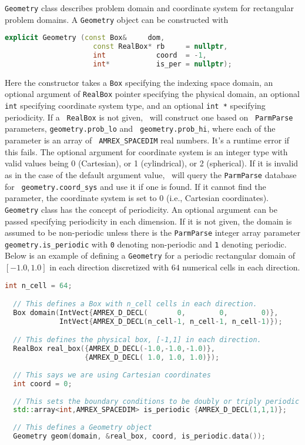 {\tt Geometry} class describes problem domain and coordinate system
for rectangular problem domains.  A {\tt Geometry} object can be
constructed with
\begin{lstlisting}[language=cpp]
  explicit Geometry (const Box&     dom,
                     const RealBox* rb     = nullptr,
                     int            coord  = -1,
                     int*           is_per = nullptr);
\end{lstlisting}
Here the constructor takes a {\tt Box} specifying the indexing space
domain, an optional argument of {\tt RealBox} pointer specifying the
physical domain, an optional {\tt int} specifying coordinate system
type, and an optional {\tt int *} specifying periodicity.  If a {\tt
  RealBox} is not given, \amrex\ will construct one based on {\tt
  ParmParse} parameters, {\tt geometry.prob\_lo} and {\tt
  geometry.prob\_hi}, where each of the parameter is an array of {\tt
  AMREX\_SPACEDIM} real numbers.  It's a runtime error if this fails.
The optional argument for coordinate system is an integer type with
valid values being 0 (Cartesian), or 1 (cylindrical), or 2
(spherical).  If it is invalid as in the case of the default argument
value, \amrex\ will query the {\tt ParmParse} database for {\tt
  geometry.coord\_sys} and use it if one is found.  If it cannot find
the parameter, the coordinate system is set to 0 (i.e., Cartesian
coordinates).  {\tt Geometry} class has the concept of periodicity.
An optional argument can be passed specifying periodicity in each
dimension.  If it is not given, the domain is assumed to be
non-periodic unless there is the {\tt ParmParse} integer array
parameter {\tt geometry.is\_periodic} with {\tt 0} denoting
non-periodic and {\tt 1} denoting periodic.  Below is an example of
defining a {\tt Geometry} for a periodic rectangular domain of
$[-1.0,1.0]$ in each direction discretized with $64$ numerical cells
in each direction.
\begin{lstlisting}[language=cpp]
  int n_cell = 64;

  // This defines a Box with n_cell cells in each direction.
  Box domain(IntVect{AMREX_D_DECL(       0,        0,        0)},
             IntVect{AMREX_D_DECL(n_cell-1, n_cell-1, n_cell-1)});

  // This defines the physical box, [-1,1] in each direction.
  RealBox real_box({AMREX_D_DECL(-1.0,-1.0,-1.0)},
                   {AMREX_D_DECL( 1.0, 1.0, 1.0)});
  
  // This says we are using Cartesian coordinates
  int coord = 0;
  
  // This sets the boundary conditions to be doubly or triply periodic
  std::array<int,AMREX_SPACEDIM> is_periodic {AMREX_D_DECL(1,1,1)};
  
  // This defines a Geometry object
  Geometry geom(domain, &real_box, coord, is_periodic.data());
\end{lstlisting}

